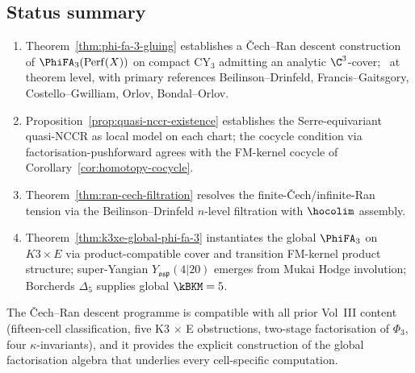 \subsection*{Status summary}

\begin{enumerate}[leftmargin=2em]
\item Theorem~\ref{thm:phi-fa-3-gluing} establishes a Čech--Ran
descent construction of $\PhiFA_3(\mathrm{Perf}(X))$ on compact CY$_3$
admitting an analytic $\C^3$-cover; \ClaimStatusConjectured\ at
theorem level, with primary references Beilinson--Drinfeld, Francis--Gaitsgory,
Costello--Gwilliam, Orlov, Bondal--Orlov.
\item Proposition~\ref{prop:quasi-nccr-existence} establishes the
Serre-equivariant quasi-NCCR as local model on each chart; the cocycle
condition via factorisation-pushforward agrees with the FM-kernel
cocycle of Corollary~\ref{cor:homotopy-cocycle}.
\item Theorem~\ref{thm:ran-cech-filtration} resolves the
finite-Čech/infinite-Ran tension via the Beilinson--Drinfeld $n$-level
filtration with $\hocolim$ assembly.
\item Theorem~\ref{thm:k3xe-global-phi-fa-3} instantiates the global
$\PhiFA_3$ on $K3 \times E$ via product-compatible cover and
transition FM-kernel product structure; super-Yangian
$Y_{\mathfrak{osp}}(4|20)$ emerges from Mukai Hodge involution;
Borcherds $\Delta_5$ supplies global $\kBKM = 5$.
\end{enumerate}

The Čech--Ran descent programme is compatible with all prior Vol~III
content (fifteen-cell classification, five K3 $\times$ E obstructions,
two-stage factorisation of $\Phi_3$, four $\kappa$-invariants), and
it provides the explicit construction of the global factorisation
algebra that underlies every cell-specific computation.


